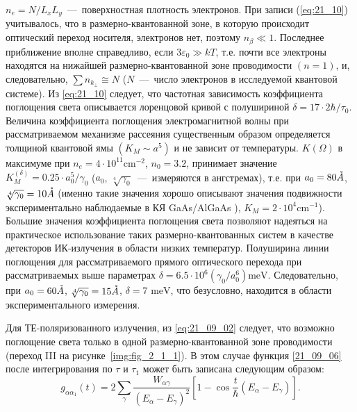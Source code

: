 $n_e =N/L_x L_y $~---~поверхностная плотность электронов. При записи (\ref{eq:21_10}) учитывалось, что в размерно-квантованной зоне, в которую происходит оптический переход носителя, электронов нет, поэтому $n_{\beta } \ll 1$. Последнее приближение вполне справедливо, если  $3\varepsilon _{0} \gg kT$, т.е. почти все электроны находятся на нижайшей размерно-квантованной зоне проводимости $(n=1)$, и, следовательно, $\sum n_{k_{\bot } } \cong N$ ($N$~---~число электронов в исследуемой квантовой системе). Из \eqref{eq:21_10} следует, что частотная зависимость коэффициента поглощения света описывается лоренцовой кривой с полушириной  $\delta =17\cdot 2\hbar /\tau_0 $. Величина коэффициента поглощения электромагнитной волны при рассматриваемом механизме рассеяния существенным образом определяется толщиной квантовой ямы $\left(K_M \sim a^5 \right)$ и не зависит от температуры. $K\left(\Omega \right)$  в максимуме при $n_e =4\cdot 10^{11} \text{cm}^{-2} $, $n_0 = 3.2$,   принимает значение   $K_M^{\left(\delta \right)} =0.25\cdot a_0^5 /\gamma_0 $ ($a_0 $, $\sqrt[4]{\gamma_0}$~--–~измеряются в ангстремах), т.е. при  $a_0 = 80 \AA$,  $\sqrt[4]{\gamma_0} = 10 \AA$ (именно такие значения   хорошо описывают значения подвижности   экспериментально наблюдаемые в КЯ GaAs/AlGaAs \cite{West1985}), $K_M =2\cdot 10^4 \text{cm}^{-1} $). Большие значения коэффициента поглощения света позволяют надеяться на практическое использование таких размерно-квантованных систем в качестве детекторов ИК-излучения в области низких температур. Полуширина линии поглощения для рассматриваемого прямого оптического перехода при рассматриваемых выше параметрах $\delta =6.5\cdot 10^6 \left(\gamma_0 /a_0^6 \right)\text{meV}$. Следовательно, при  $a_0 = 60 \AA$,  $\sqrt[4]{\gamma_0} = 15 \AA$,  $\delta = 7 \text{ meV}$, что безусловно, находится в области экспериментального измерения.

Для ТЕ-поляризованного излучения, из \eqref{eq:21_09_02} следует, что  возможно поглощение света только в одной размерно-квантованной зоне проводимости (переход III на рисунке~\ref{img:fig_2_1_1}). В этом случае функция \eqref{21_09_06} после интегрирования по $\tau$ и $\tau_1$ может быть записана следующим образом:
\begin{equation} \label{eq:21_09_12}
g_{\alpha\alpha_1 }(t) =2 \sum_{\gamma}  \frac{ W_{\alpha\gamma }}{\left(E_{\alpha} - E_{\gamma} \right)^2 } \left[1 - \cos{\frac{t}{\hbar} \left( E_{\alpha} - E_{\gamma} \right) } \right] .
\end{equation}

